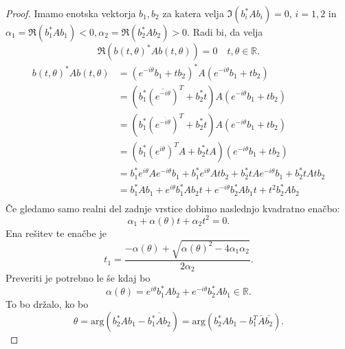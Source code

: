 \documentclass[12pt,a4paper]{amsart}
\theoremstyle{definition}
\theoremstyle{plain}
\newcommand{\R}{\mathbb R}
\begin{document}
\begin{proof}
Imamo enotska vektorja $b_1, b_2$ za katera velja $\Im(b_i^\ast Ab_i)=0$, $i=1,2$ in $\alpha_1=\Re(b_1^\ast Ab_1)<0, \alpha_2=\Re(b_2^\ast Ab_2)>0$. Radi bi, da velja
$$\Re(b(t,\theta)^\ast Ab(t,\theta))=0 \quad t,\theta \in \R.$$
\begin{align*}
b(t,\theta)^\ast Ab(t,\theta) &=(e^{-i\theta}b_1 + tb_2)^\ast A (e^{-i\theta}b_1 + tb_2)\\
& = (b_{1}^\ast(\overline{e^{-i\theta}})^T  +b_{2}^\ast t ) A (e^{-i\theta}b_1 + tb_2)\\
& = (b_{1}^\ast(e^{\overline{-i\theta}})^T + b_{2}^\ast t) A (e^{-i\theta}b_1 + tb_2)\\
& = (b_{1}^\ast(e^{i\theta})^T A+ b_{2}^\ast t A) (e^{-i\theta}b_1 + tb_2)\\
& = b_1 ^\ast e^{i\theta} A e^{-i\theta}b_1 + b_1 ^\ast e^{i\theta} A tb_2 + b_2 ^\ast t A e^{-i\theta} b_1 + b_2 ^\ast t Atb_2\\
& = b_1 ^\ast Ab_1 + e^{i\theta} b_1 ^\ast A b_2 t + e^{-i\theta}b_2 ^\ast Ab_1 t + t^2 b_2 ^\ast Ab_2\\
\end{align*}
Če gledamo samo realni del zadnje vrstice dobimo naslednjo kvadratno enačbo:
$$\alpha _1 +  \alpha(\theta)t +  \alpha_2 t^2 =0.$$
Ena rešitev te enačbe je 
$$t_1 = \frac{-\alpha(\theta) + \sqrt{\alpha(\theta)^2 - 4\alpha_1 \alpha_2}}{2\alpha_2}.$$
Preveriti je potrebno le še kdaj bo $$\alpha(\theta)=e^{i\theta}b_1^\ast Ab_2 +e^{-i\theta}b_2^\ast Ab_1 \in \R.$$
To bo držalo, ko bo $$\theta = \text{arg}(b_2^\ast Ab_1 - \overline{b_1^\ast Ab_2}) = \text{arg}(b_2^\ast Ab_1 -b_1^T\bar{A}\bar{b_2}).$$
\end{proof}
\end{document}
